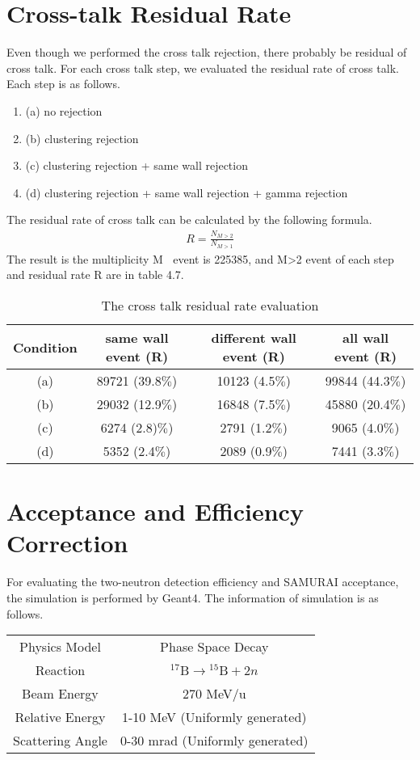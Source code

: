\section{Cross-talk Residual Rate}
Even though we performed the cross talk rejection, there probably be residual of cross talk. For each cross talk step, we evaluated the residual rate of cross talk. Each step is as follows.
\begin{enumerate}
    \item (a) no rejection
    \item (b) clustering rejection
    \item (c) clustering rejection + same wall rejection
    \item (d) clustering rejection + same wall rejection + gamma rejection
\end{enumerate}
The residual rate of cross talk can be calculated by the following formula.
\begin{align}
    R = \frac{N_{M>2}}{N_{M>1}}
\end{align}
The result is the multiplicity M $\>$ event is 225385, and M>2 event of each step and residual rate R are in table 4.7.
\begin{table}[h]
    \centering
    \begin{tabular}[h]{c|c|c|c}
        \hline
        Condition & same wall event (R) & different wall event (R) & all wall event (R)\\
        \hline
        (a) & 89721 (39.8$\%$) & 10123 (4.5$\%$) & 99844 (44.3$\%$) \\
        (b) & 29032 (12.9$\%$) & 16848 (7.5$\%$) & 45880 (20.4$\%$)\\
        (c) & 6274 (2.8)$\%$)   & 2791 (1.2$\%$)& 9065 (4.0$\%$)\\
        (d) & 5352 (2.4$\%$)& 2089 (0.9$\%$)& 7441 (3.3$\%$)\\
        \hline
    \end{tabular}
    \caption{The cross talk residual rate evaluation}
\end{table}

\section{Acceptance and Efficiency Correction}
For evaluating the two-neutron detection efficiency and SAMURAI acceptance, the simulation is performed by Geant4. The information of simulation is as follows.

\begin{center}
    \begin{tabular}[h]{c|c}
        \hline
        Physics Model & Phase Space Decay \\
        Reaction & ${}^{17}\text{B} \to {}^{15}\text{B} + 2n$\\
        Beam Energy & 270 MeV/u\\
        Relative Energy & 1-10 MeV (Uniformly generated)\\
        Scattering Angle & 0-30 mrad (Uniformly generated)\\
        \hline
    \end{tabular}
\end{center}

